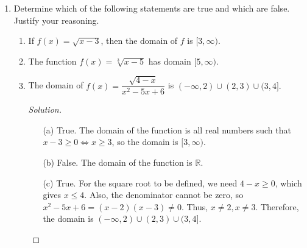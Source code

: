 \documentclass[12pt]{article}
\newenvironment{solution}{\begin{proof}[Solution]}{\end{proof}}
\begin{document}
\begin{enumerate}
\begin{solution}
\begin{itemize}
						To find the zeroes, we need to solve the equation $f(x)=\dfrac{(x-1)(x-4)}{\sqrt{x^2-4x+3}}$, i.e., $(x-1)(x-4)=0\iff x=1 \text{ or } x=4$. But 1 is not in the domain of the function, so the only zero is 4.
						\item[(c)] 	The domain of the function is all $x$ such that $x-1\geq 0\iff x\geq 1$ and such that $x^2-6x+5\neq 0$, i.e. $(1,5)\cup(5,\infty)$.
						
						To find the zeroes, we need to solve the equation $\dfrac{(x-1)^{3/2}-8}{x^2-6x+5}=0$, i.e., $(x-1)^{3/2}-8=0$.
						\begin{align*}
							(x-1)^{3/2}-8=0&\iff (x-1)^{3/2}=8\\
							&\iff x-1=8^{2/3}\\
							&\iff x-1=4\\
							&\iff x=5
						\end{align*}
						But 5 is not in the domain of the function, so the function has no zeroes.
					\end{itemize}
				\end{solution}
				
				\item Determine which of the following statements are true and which are false. Justify your reasoning.
				\begin{enumerate}
					
					\item If $f(x)=\sqrt{x-3}$, then the domain of $f$ is $[3,\infty)$.
					
					\item The function $f(x)=\sqrt[3]{x-5}$ has domain $[5,\infty)$.
					
					\item The domain of  $f(x)=\dfrac{\sqrt{4-x}}{x^2-5x+6}$ is $(-\infty,2)\cup(2,3)\cup(3,4].$
					
				\begin{solution}
					\begin{itemize}
						\item[(a)] True. The domain of the function is all real numbers such that $x-3\geq 0 \iff x\geq 3$, so the domain is $[3,\infty)$.
						\item[(b)] False. The domain of the function is $\mathbb{R}$.
						
						\item[(c)] True. For the square root to be defined, we need $4-x\geq 0$, which gives $x\leq 4$. Also, the denominator cannot be zero, so $x^2-5x+6=(x-2)(x-3)\neq 0$. Thus, $ x\neq 2,x\neq 3.$ Therefore, the domain is $(-\infty,2)\cup(2,3)\cup(3,4]$.
					\end{itemize}
				\end{solution}	
						
				\end{enumerate}
			
				
			\end{enumerate}
			
\end{document}
